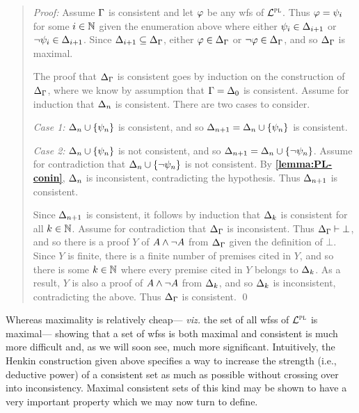 \begin{quote} 
  \textit{Proof:} 
  Assume $\Gamma$ is consistent and let $\varphi$ be any wfs of $\mathcal{L}^{\textsc{pl}}$.
  Thus $\varphi=\psi_i$ for some $i\in\mathbb{N}$ given the enumeration above where either $\psi_i\in\Delta_{i+1}$ or $\neg\psi_i\in\Delta_{i+1}$.
  Since $\Delta_{i+1}\subseteq\Delta_{\Gamma}$, either $\varphi\in\Delta_{\Gamma}$ or $\neg\varphi\in\Delta_{\Gamma}$, and so $\Delta_{\Gamma}$ is maximal.

  The proof that $\Delta_{\Gamma}$ is consistent goes by induction on the construction of $\Delta_{\Gamma}$, where we know by assumption that $\Gamma=\Delta_0$ is consistent. 
  Assume for induction that $\Delta_n$ is consistent. 
  There are two cases to consider.

  \textit{Case 1:} $\Delta_n\cup\lbrace\psi_n\rbrace$ is consistent, and so $\Delta_{n+1}=\Delta_n\cup\lbrace\psi_n\rbrace$ is consistent. 

  \textit{Case 2:} $\Delta_n\cup\lbrace\psi_n\rbrace$ is not consistent, and so $\Delta_{n+1}=\Delta_n\cup\lbrace\neg\psi_n\rbrace$. 
  Assume for contradiction that $\Delta_n\cup\lbrace\neg\psi_n\rbrace$ is not consistent. 
  By \textbf{\ref{lemma:PL-conin}}, $\Delta_n$ is inconsistent, contradicting the hypothesis. 
  Thus $\Delta_{n+1}$ is consistent. 

  Since $\Delta_{n+1}$ is consistent, it follows by induction that $\Delta_k$ is consistent for all $k\in\mathbb{N}$.
  Assume for contradiction that $\Delta_{\Gamma}$ is inconsistent.
  Thus $\Delta_{\Gamma}\vdash \bot$, and so there is a proof $Y$ of $A\wedge\neg A$ from $\Delta_{\Gamma}$ given the definition of $\bot$. 
  Since $Y$ is finite, there is a finite number of premises cited in $Y$, and so there is some $k\in\mathbb{N}$ where every premise cited in $Y$ belongs to $\Delta_k$.
  As a result, $Y$ is also a proof of $A\wedge\neg A$ from $\Delta_k$, and so $\Delta_k$ is inconsistent, contradicting the above. 
  Thus $\Delta_{\Gamma}$ is consistent. 
  \qed
\end{quote}



Whereas maximality is relatively cheap--- \textit{viz.} the set of all wfss of $\mathcal{L}^{\textsc{pl}}$ is maximal--- showing that a set of wfss is both maximal and consistent is much more difficult and, as we will soon see, much more significant.
Intuitively, the Henkin construction given above specifies a way to increase the strength (i.e., deductive power) of a consistent set as much as possible without crossing over into inconsistency.
Maximal consistent sets of this kind may be shown to have a very important property which we may now turn to define.

